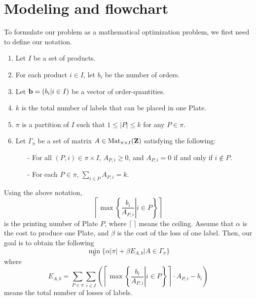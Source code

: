 \documentclass[a4paper]{amsart}
\numberwithin{equation}{section} %
\numberwithin{figure}{section} %
\numberwithin{table}{section}
\theoremstyle{plain}
\theoremstyle{definition}
\theoremstyle{plain}
\theoremstyle{plain}
\theoremstyle{plain}
\theoremstyle{plain}
\theoremstyle{plain}
\begin{document}
\section{Modeling and flowchart}\label{sec:Modeling}
To formulate our problem as a mathematical optimization problem, we first need to define our notation.
\begin{enumerate}[$\bullet$]
	\item Let $I$ be a set of products.
	\item For each product $i \in I$, let $b_{i}$ be the number of orders.
	\item Let ${\bf b}=(b_{i}|i \in I)$ be a vector of order-quantities.
	\item $k$ is the total number of labels that can be placed in one Plate.
	\item $\pi$ is a partition of $I$ such that $1 \leq  |P| \leq k$ for any $P \in \pi$. 
	\item Let $\Gamma_{\pi}$ be a set of matrix $A \in {\rm Mat}_{\pi \times I}(\mathbf{Z})$ satisfying the following:
	\begin{itemize}
		\item[-] For all $(P,i) \in \pi \times I$, $A_{P,i} \geq 0$, and $A_{P,i} = 0$ if and only if $i \notin P$.
		\item[-] For each $P \in \pi$, $\sum_{i \in P}A_{P, i} = k$.
\end{itemize}
\end{enumerate}

Using the above notation,
\begin{equation}\label{eq:NumPlate}
	\left\lceil \max \left\{ \left.\frac{b_{i}}{A_{P,i}}\right|i \in P \right\} \right\rceil
\end{equation}
is the printing number of Plate $P$, where $\lceil~\rceil$ means the ceiling. 
Assume that $\alpha$ is the cost to produce one Plate, and $\beta$ is the cost of the loss of one label. 
Then, our goal is to obtain the following 
\begin{equation}\label{eq:TotalCost}
	\min_{\pi} \{ \alpha|\pi| + \beta E_{A,b} | A \in \Gamma_{\pi} \}
\end{equation}
where
\begin{equation}\label{eq:TotalLoss}
	E_{A,b} = \sum_{P \in \pi} \sum_{i \in I} \left( \left\lceil \max \left\{ \left.\frac{b_{i}}{A_{P,i}}\right|i \in P \right\} \right\rceil \cdot A_{P,i} - b_{i} \right)
\end{equation}
means the total number of losses of labels.
\end{document}
